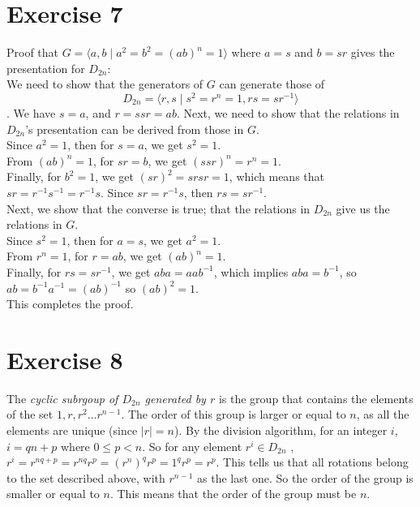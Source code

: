 \documentclass[12pt]{article}
\begin{document}
    
    \section*{Exercise 7}
    Proof that
    $G = \langle a, b \mid a^2 = b^2 = (ab)^n = 1 \rangle$
    where $a = s$ and $b = sr$ gives the presentation for $D_{2n}$: \\
    We need to show that the generators of $G$ can generate those of
    \[D_{2n} = \langle r, s \mid s^2 = r^n = 1, rs = sr^{-1} \rangle\].
    We have $s = a$, and $r = ssr = ab$.
    Next, we need to show that the relations in $D_{2n}$'s presentation
    can be derived from those in $G$. \\
    Since $a^2 = 1$, then for $s = a$,
    we get $s^2 = 1$. \\
    From $(ab)^n = 1$, for $sr = b$,
    we get $(ssr)^n = r^n = 1$. \\
    Finally, for $b^2 = 1$,
    we get $(sr)^2 = srsr = 1$, which means that $sr = r^{-1}s^{-1} = r^{-1}s$.
    Since $sr = r^{-1}s$, then $rs = sr^{-1}$. \\
    Next, we show that the converse is true;
    that the relations in $D_{2n}$ give us the relations in $G$. \\
    Since $s^2 = 1$, then for $a = s$,
    we get $a^2 = 1$. \\
    From $r^n = 1$, for $r = ab$,
    we get $(ab)^n = 1$. \\
    Finally, for $rs = sr^{-1}$,
    we get $aba = aab^{-1}$,
    which implies $aba = b^{-1}$,
    so $ab = b^{-1}a^{-1} = (ab)^{-1}$
    so $(ab)^2 = 1$. \\
    This completes the proof.


    \section*{Exercise 8}
    The \textit{cyclic subrgoup of $D_{2n}$ generated by $r$} is the group
    that contains the elements of the set ${1, r, r^2 ... r^{n-1}}$.
    The order of this group is larger or equal to $n$,
    as all the elements are unique (since $|r| = n$).
    By the division algorithm, for an integer $i$, $i = qn + p$
    where $0 \leqslant p < n$.
    So for any element $r^i \in D_{2n}$ ,
    $r^i = r^{nq + p} = r^{nq}r^p = (r^n)^qr^p = 1^qr^p = r^p$.
    This tells us that all rotations belong to the set described above,
    with $r^{n-1}$ as the last one.
    So the order of the group is smaller or equal to $n$.
    This means that the order of the group must be $n$.
    
\end{document}
